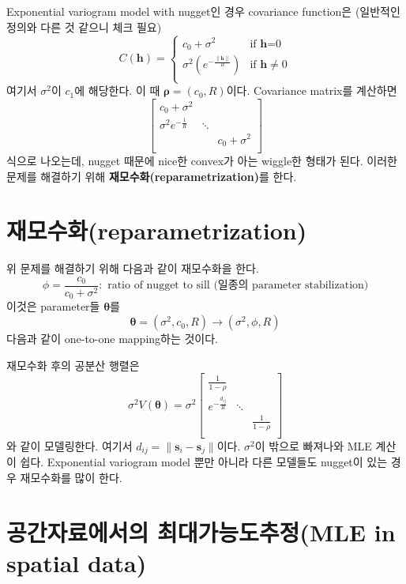 \documentclass[b5paper,]{book}
\theoremstyle{definition}
\theoremstyle{definition}
\theoremstyle{definition}
\theoremstyle{remark}
\begin{document}
Exponential variogram model with nugget인 경우 covariance function은
(일반적인 정의와 다른 것 같으니 체크 필요) \[
C(\mathbf{h})=
\begin{cases}
c_{0}+\sigma^{2} & \text{if $\mathbf{h}$=0}\\
\sigma^{2}(e^{-\frac{\|\mathbf{h}\|}{R}}) & \text{if $\mathbf{h}\neq 0$}\\
\end{cases}
\] 여기서 \(\sigma^{2}\)이 \(c_{1}\)에 해당한다. 이 때
\(\boldsymbol{\rho}=(c_{0},R)\)이다. Covariance matrix를 계산하면 \[
\begin{bmatrix}
c_{0}+\sigma^{2} &  &  \\
\sigma^{2}e^{-\frac{1}{R}} & \ddots &  \\
 &  & c_{0}+\sigma^{2}\\
\end{bmatrix}
\] 식으로 나오는데, nugget 때문에 nice한 convex가 아는 wiggle한 형태가
된다. 이러한 문제를 해결하기 위해 \textbf{재모수화(reparametrization)}를
한다.

\section{재모수화(reparametrization)}\label{reparametrization}

위 문제를 해결하기 위해 다음과 같이 재모수화을 한다.
\[\phi=\frac{c_{0}}{c_{0}+\sigma^{2}}: \text{ ratio of nugget to sill (일종의 parameter stabilization)}\]
이것은 parameter들 \(\boldsymbol{\theta}\)를
\[\boldsymbol{\theta}=(\sigma^{2}, c_{0}, R) \rightarrow (\sigma^{2}, \phi , R)\]
다음과 같이 one-to-one mapping하는 것이다.

재모수화 후의 공분산 행렬은 \[
\sigma^{2}V(\boldsymbol{\theta}) = \sigma^{2} 
\begin{bmatrix}
\frac{1}{1-\rho} &  &  \\
e^{-\frac{d_{ij}}{R}} & \ddots &  \\
 &  & \frac{1}{1-\rho}\\
\end{bmatrix}
\] 와 같이 모델링한다. 여기서
\(d_{ij}=\|\mathbf{s}_{i}-\mathbf{s}_{j}\|\)이다. \(\sigma^{2}\)이
밖으로 빠져나와 MLE 계산이 쉽다. Exponential variogram model 뿐만 아니라
다른 모델들도 nugget이 있는 경우 재모수화를 많이 한다.

\section{공간자료에서의 최대가능도추정(MLE in spatial
data)}\label{-mle-in-spatial-data}
\end{document}
